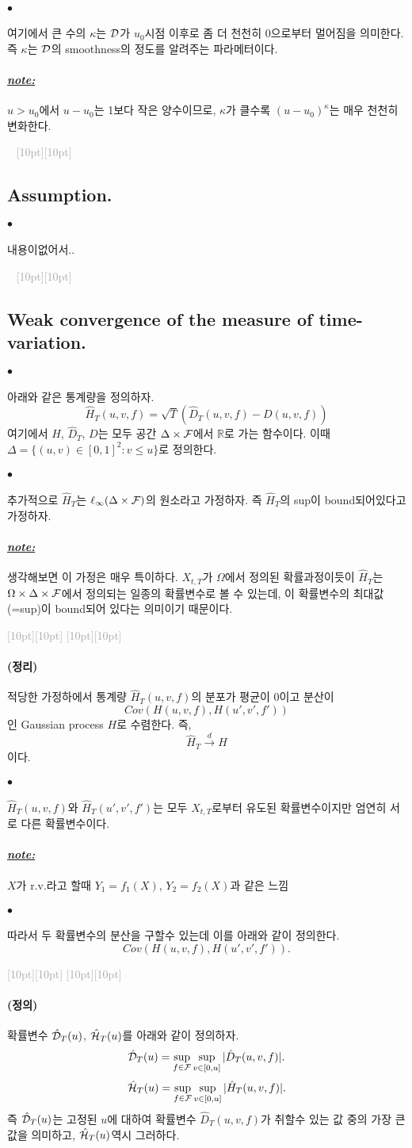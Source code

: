 \documentclass[12pt,oneside,english]{book}
\newcommand{\dash}{\vspace{2em}\noindent \textcolor{darkgray}{\hrulefill~ \raisebox{-2.5pt}[10pt][10pt]{\leafright \decofourleft \decothreeleft  \aldineright \decotwo \floweroneleft \decoone   \floweroneright \decotwo \aldineleft\decothreeright \decofourright \leafleft} ~  \hrulefill \\ \vspace{2em}}}
\newcommand{\rdash}{\noindent \textcolor{darkgray}{ \raisebox{-1.9pt}[10pt][10pt]{\leafright} \hrulefill \raisebox{-1.9pt}[10pt][10pt]{\leafright \decofourleft \decothreeleft  \aldineright \decotwo \floweroneleft \decoone}}}
\def\ck{\paragraph{\LARGE$\bullet$}\LARGE}
\def\dfn{\paragraph{\LARGE(정의)}\LARGE}
\def\thm{\paragraph{\LARGE(정리)}\LARGE}
\def\note{\paragraph{\LARGE\textit{\underline{note:}}}\LARGE}
\begin{document}
\ck 여기에서 큰 수의 $\kappa$는 $\cal D$가 $u_0$시점 이후로 좀 더 천천히 $0$으로부터 멀어짐을 의미한다. 즉 $\kappa$는 $\cal D$의 smoothness의 정도를 알려주는 파라메터이다. 

\note $u>u_0$에서 $u-u_0$는 1보다 작은 양수이므로, $\kappa$가 클수록 $(u-u_0)^{\kappa}$는 매우 천천히 변화한다.

\dash 

\subsection{Assumption.}

\ck 내용이없어서.. 

\dash 

\subsection{Weak convergence of the measure of time-variation.}

\ck 아래와 같은 통계량을 정의하자. 
$$\hat{H}_T(u,v,f)=\sqrt{T}\left(\hat{D}_T(u,v,f)-D(u,v,f)\right)$$ 
여기에서 $\hat{H}$, $\hat{D}_T$, $D$는 모두 공간 $\Delta \times {\cal F}$에서 $\mathbb{R}$로 가는 함수이다. 이때 $\Delta=\{(u,v)\in [0,1]^2:v\leq u\}$로 정의한다. 

\ck 추가적으로 $\hat{H}_T$는 $\ell_{\infty}(\Delta \times {\cal F})$의 원소라고 가정하자. 즉 $\hat{H}_T$의 sup이 bound되어있다고 가정하자.

\note 생각해보면 이 가정은 매우 특이하다. $X_{t,T}$가 $\Omega$에서 정의된 확률과정이듯이 $\hat{H}_T$는 $\Omega \times \Delta \times {\cal F}$에서 정의되는 일종의 확률변수로 볼 수 있는데, 이 확률변수의 최대값(=sup)이 bound되어 있다는 의미이기 때문이다.

\rdash 

\thm 적당한 가정하에서 통계량 $\hat{H}_T(u,v,f)$의 분포가 평균이 0이고 분산이 $$Cov(H(u,v,f),H(u',v',f'))$$인 Gaussian process $H$로 수렴한다. 즉, 
$$\hat{H}_T \overset{d}{\longrightarrow} H$$
이다. 

\ck $\hat{H}_T(u,v,f)$와 $\hat{H}_T(u',v',f')$는 모두 $X_{t,T}$로부터 유도된 확률변수이지만 엄연히 서로 다른 확률변수이다. 

\note $X$가 r.v.라고 할때 $Y_1=f_1(X)$, $Y_2=f_2(X)$과 같은 느낌

\ck 
따라서 두 확률변수의 분산을 구할수 있는데 이를 아래와 같이 정의한다. 
$$Cov(H(u,v,f),H(u',v',f')).$$

\rdash

\dfn 확률변수 $\hat{\cal D}_T(u)$, $\hat{\cal H}_T(u)$를 아래와 같이 정의하자. 
$$\hat{\cal D}_T(u)=\sup_{f\in {\cal F}}\sup_{v \in [0,u]} |\hat{D}_T(u,v,f)|.$$
$$\hat{\cal H}_T(u)=\sup_{f\in {\cal F}}\sup_{v \in [0,u]} |\hat{H}_T(u,v,f)|.$$
즉 $\hat{\cal D}_T(u)$는 고정된 $u$에 대하여 확률변수 $\hat{D}_T(u,v,f)$가 취할수 있는 값 중의 가장 큰 값을 의미하고, $\hat{\cal H}_T(u)$역시 그러하다. 
\end{document}
